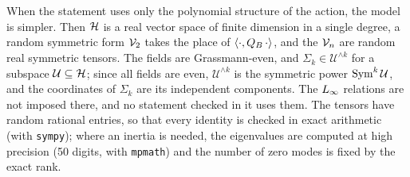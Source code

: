 When the statement uses only the polynomial structure of the action, the model is simpler.
Then $\mathcal{H}$ is a real vector space of finite dimension in a single degree, a random symmetric form $\mathcal{V}_{2}$ takes the place of $\braket{\cdot, Q_B \, \cdot}_{}$, and the $\mathcal{V}_{n}$ are random real symmetric tensors.
The fields are Grassmann-even, and $\Sigma_k \in \mathcal U^{\wedge k}$ for a subspace $\mathcal U \subseteq \mathcal{H}$; since all fields are even, $\mathcal U^{\wedge k}$ is the symmetric power $\operatorname{Sym}^k \mathcal U$, and the coordinates of $\Sigma_k$ are its independent components.
The $L_\infty$ relations are not imposed there, and no statement checked in it uses them.
The tensors have random rational entries, so that every identity is checked in exact arithmetic (with \texttt{sympy}); where an inertia is needed, the eigenvalues are computed at high precision (50 digits, with \texttt{mpmath}) and the number of zero modes is fixed by the exact rank.

